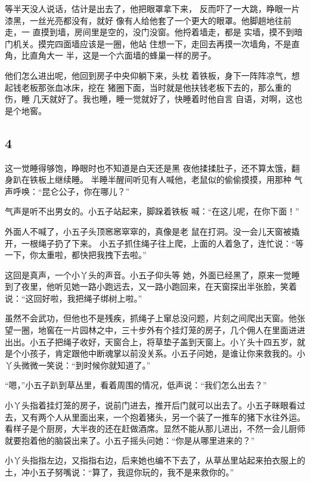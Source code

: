 等半天没人说话，估计是出去了，他把眼罩拿下来， 反而吓了一大跳，睁眼一片漆黑，一丝光亮都没有，就好 像有人给他套了一个更大的眼罩。他脚趟地往前走，一 直摸到墙，房间里是空的，没门没窗。他捋着墙走，都是 实墙，摸不到暗门机关。摸完四面墙应该是一圈，他站 住想一下，走回去再摸一次墙角，不是直角，比直角大一 半，这是一个六面墙的蜂巢一样的房子。

他们怎么进出呢，他回到房子中央仰躺下来，头枕 着铁板，身下一阵阵凉气，想起钱老板那张血冰床，挖在 猪圈下面，当时就是他扶钱老板下去的，那么重的伤，睡 几天就好了。我也睡，睡一觉就好了，快睡着时他自言 自语，对啊，这也是个地窖。
\newline

{\centering\subsection{4}}

这一觉睡得够饱，睁眼时也不知道是白天还是黑 夜他揉揉肚子，还不算太饿，翻身趴在铁板上继续睡。 半睡半醒间听见有人喊他，老鼠似的偷偷摸摸，用那种 气声呼唤：“昆仑公子，你在哪儿？”

气声是听不出男女的。小五子站起来，脚跺着铁板 喊：“在这儿呢，在你下面！”

外面人不喊了，小五子头顶窸窸窣窣的，真像是老 鼠在打洞。没一会儿天窗被撬开，一根绳子扔了下来。 小五子抓住绳子往上爬，上面的人着急了，连忙说：“等一下，你太重啦，都快把我拽下去啦。”

这回是真声，一个小丫头的声音。小五子仰头等 她，外面已经黑了，原来一觉睡到了夜里，他听见她一路小跑远去，又一路小跑回来，在天窗探出半张脸，笑着 说：“这回好啦，我把绳子绑树上啦。”

虽然不会武功，但他也不是残疾，抓绳子上窜总没问题，片刻之间爬出天窗。他张望一圈，地窖在一片园林之中，三十步外有个挂灯笼的房子，几个佣人在里面进进出出。小五子把绳子收好，天窗合上，将草垫子盖到天窗上。小丫头十四五岁，就是个小孩子，肯定跟他中断魂掌以前没关系。小五子问她，是谁让你来救我的。小丫头微微一笑说：“到时候你就知道了。”

“嗯，”小五子趴到草丛里，看着周围的情况，低声说：“我们怎么出去？”

小丫头指着挂灯笼的房子，说前门进去，推开后门就可以出去了。小五子眯眼看过去，又有两个人从里面出来，一个抱着猪头，另一个装了一推车的猪下水往外运。看样子是个厨房，大半夜的还在赶做酒席。显然不能从那儿进出，不然一会儿厨师就要抱着他的脑袋出来了。小五子摇头问她：“你是从哪里进来的？”

小丫头指指左边，又指指右边，后来她也编不下去了，从草丛里站起来拍衣服上的土，冲小五子努嘴说：“算了，我逗你玩的，我不是来救你的。”

